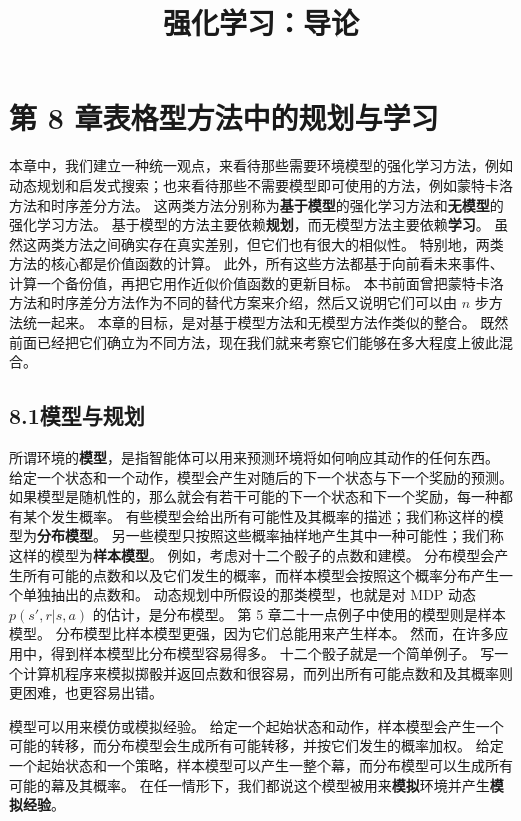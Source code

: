 \documentclass[UTF8, 12pt, fontset=fandol, oneside]{ctexart}
\title{强化学习：导论}
\author{}
\date{}
\begin{document}
\maketitle

\section*{第 8 章\quad 表格型方法中的规划与学习}

本章中，我们建立一种统一观点，来看待那些需要环境模型的强化学习方法，例如动态规划和启发式搜索；也来看待那些不需要模型即可使用的方法，例如蒙特卡洛方法和时序差分方法。
这两类方法分别称为\textbf{基于模型}的强化学习方法和\textbf{无模型}的强化学习方法。
基于模型的方法主要依赖\textbf{规划}，而无模型方法主要依赖\textbf{学习}。
虽然这两类方法之间确实存在真实差别，但它们也有很大的相似性。
特别地，两类方法的核心都是价值函数的计算。
此外，所有这些方法都基于向前看未来事件、计算一个备份值，再把它用作近似价值函数的更新目标。
本书前面曾把蒙特卡洛方法和时序差分方法作为不同的替代方案来介绍，然后又说明它们可以由 $n$ 步方法统一起来。
本章的目标，是对基于模型方法和无模型方法作类似的整合。
既然前面已经把它们确立为不同方法，现在我们就来考察它们能够在多大程度上彼此混合。

\subsection*{8.1\quad 模型与规划}

所谓环境的\textbf{模型}，是指智能体可以用来预测环境将如何响应其动作的任何东西。
给定一个状态和一个动作，模型会产生对随后的下一个状态与下一个奖励的预测。
如果模型是随机性的，那么就会有若干可能的下一个状态和下一个奖励，每一种都有某个发生概率。
有些模型会给出所有可能性及其概率的描述；我们称这样的模型为\textbf{分布模型}。
另一些模型只按照这些概率抽样地产生其中一种可能性；我们称这样的模型为\textbf{样本模型}。
例如，考虑对十二个骰子的点数和建模。
分布模型会产生所有可能的点数和以及它们发生的概率，而样本模型会按照这个概率分布产生一个单独抽出的点数和。
动态规划中所假设的那类模型，也就是对 MDP 动态 $p(s',r|s,a)$ 的估计，是分布模型。
第 5 章二十一点例子中使用的模型则是样本模型。
分布模型比样本模型更强，因为它们总能用来产生样本。
然而，在许多应用中，得到样本模型比分布模型容易得多。
十二个骰子就是一个简单例子。
写一个计算机程序来模拟掷骰并返回点数和很容易，而列出所有可能点数和及其概率则更困难，也更容易出错。

模型可以用来模仿或模拟经验。
给定一个起始状态和动作，样本模型会产生一个可能的转移，而分布模型会生成所有可能转移，并按它们发生的概率加权。
给定一个起始状态和一个策略，样本模型可以产生一整个幕，而分布模型可以生成所有可能的幕及其概率。
在任一情形下，我们都说这个模型被用来\textbf{模拟}环境并产生\textbf{模拟经验}。
\end{document}
